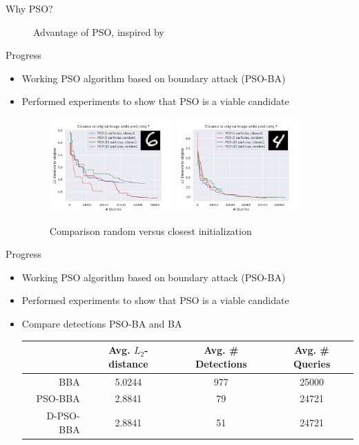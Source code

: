 \documentclass[11pt,t]{beamer}
\begin{document}
\begin{frame}{Why PSO?}
\begin{figure}
{\begin{tikzpicture}[x=0.75pt,y=0.75pt,yscale=-1,xscale=1]
\end{tikzpicture}
}
\caption{Advantage of PSO, inspired by \cite{brendel2018decisionbased}}
\label{fig:pso_advantage_rand}
\end{figure}
\end{frame}

\begin{frame}[plain]{Progress}
\begin{itemize}
	\item Working PSO algorithm based on boundary attack (PSO-BA)
	\item Performed experiments to show that PSO is a viable candidate
	\begin{figure}
	\centering
	\includegraphics[width=0.45\textwidth]{graphics/random_vs_closest.png}
	\includegraphics[width=0.45\textwidth]{graphics/random_vs_closest_1.png}
	\caption{Comparison random versus closest initialization\label{fig:rand_vs_close}}
	\footnotesize
	\flushleft
	\end{figure}
\end{itemize}
\end{frame}

\begin{frame}{Progress}
\begin{itemize}
	\item Working PSO algorithm based on boundary attack (PSO-BA)
	\item Performed experiments to show that PSO is a viable candidate
	\item Compare detections PSO-BA and BA
	\begin{table}
		\begin{tabular}{r|c|c|c}
			& Avg. $L_2$-distance & Avg. \# Detections & Avg. \# Queries \\ \hline
		BBA	& 5.0244 &977 &25000 \\
		PSO-BBA & 2.8841	&79	&24721 \\
		D-PSO-BBA & 2.8841 &51 &24721 \\
		\end{tabular}
	\end{table}
\end{itemize}
\end{frame}
\end{document}
